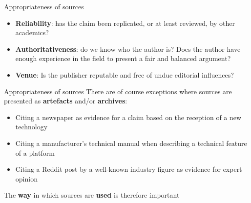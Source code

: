 \begin{frame}{Appropriateness of sources}
	\begin{itemize}
		\pause\item \textbf{Reliability}: has the claim been replicated, or at least reviewed, by other academics?
		\pause\item \textbf{Authoritativeness}: do we know who the author is?
			Does the author have enough experience in the field to present a fair and balanced argument?
		\pause\item \textbf{Venue}: Is the publisher reputable and free of undue editorial influences?
	\end{itemize}
\end{frame}

\begin{frame}{Appropriateness of sources}
	\pause There are of course exceptions where sources are presented as \textbf{artefacts} and/or \textbf{archives}:
	\begin{itemize}
		\pause\item Citing a newspaper as evidence for a claim based on the reception of a new technology
		\pause\item Citing a manufacturer's technical manual when describing a technical feature of a platform
		\pause\item Citing a Reddit post by a well-known industry figure as evidence for expert opinion
	\end{itemize}
	\pause The \textbf{way} in which sources are \textbf{used} is therefore important
\end{frame}
